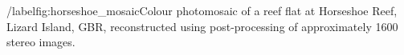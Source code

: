 /label{fig:horseshoe_mosaic}Colour photomosaic of a reef flat at Horseshoe Reef, Lizard Island, GBR, reconstructed using post-processing of approximately 1600 stereo images.